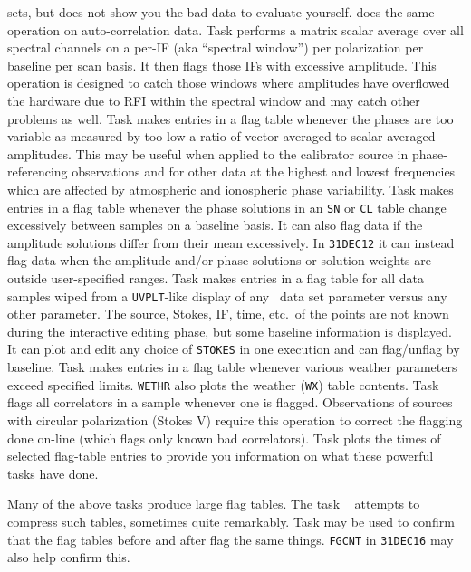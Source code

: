     sets, but does not show you the bad data to evaluate yourself.
    {\tt {}} does the same operation on auto-correlation
    data.
\Item Task {\tt {}} performs a matrix scalar average over
    all spectral channels on a per-IF (aka ``spectral window'') per
    polarization per baseline per scan basis.  It then flags those IFs
    with excessive amplitude.  This operation is designed to catch
    those windows where amplitudes have overflowed the hardware due to
    RFI within the spectral window and may catch other problems as
    well.
\Item Task {\tt {}} makes entries in a flag table whenever
    the phases are too variable as measured by too low a ratio of
    vector-averaged to scalar-averaged amplitudes.  This may be useful
    when applied to the calibrator source in phase-referencing
    observations and for other data at the highest and lowest
    frequencies which are affected by atmospheric and ionospheric phase
    variability.
\Item Task {\tt {}} makes entries in a flag table whenever
    the phase solutions in an {\tt SN} or {\tt CL} table change
    excessively between samples on a baseline basis.  It can also flag
    data if the amplitude solutions differ from their mean
    excessively.  In {\tt 31DEC12} it can instead flag data when the
    amplitude and/or phase solutions or solution weights are outside
    user-specified ranges.
\Item Task {\tt {}} makes entries in a flag table for all
    data samples wiped from a {\tt UVPLT}-like display of any \uv\
    data set parameter versus any other parameter.  The source,
    Stokes, IF, time, etc.~of the points are not known during the
    interactive editing phase, but some baseline information is
    displayed.  It can plot and edit any choice of {\tt STOKES} in one
    execution and can flag/unflag by baseline.
\Item Task {\tt {}} makes entries in a flag table whenever
    various weather parameters exceed specified limits.  {\tt WETHR}
    also plots the weather ({\tt WX}) table contents.
\Item Task {\tt {}} flags all correlators in a sample
    whenever one is flagged.  Observations of sources with circular
    polarization (Stokes V) require this operation to correct the
    flagging done on-line (which flags only known bad correlators).
\Item Task {\tt \tndx{FGPLT}} plots the times of selected flag-table
    entries to provide you information on what these powerful tasks
    have done.
\xeit

Many of the above tasks produce large flag tables.  The task {\tt
\tndx{REFLG}} attempts to compress such tables, sometimes quite
remarkably.  Task {\tt {}} may be used to confirm that the
flag tables before and after flag the same things.  {\tt FGCNT} in
{\tt 31DEC16} may also help confirm this.


